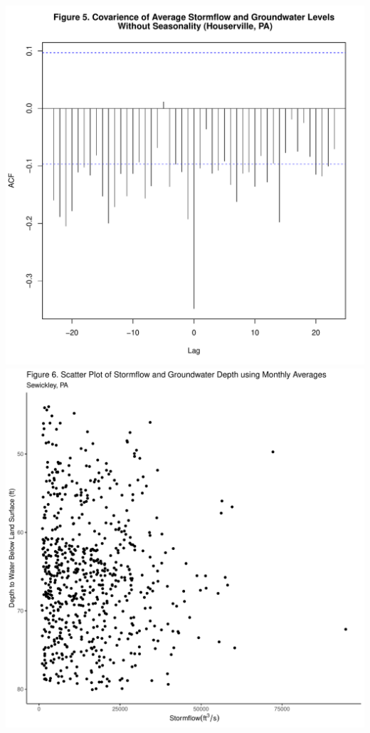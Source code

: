 \documentclass[
  12pt,
]{article}
\begin{document}
\includegraphics{Elliott_WDA_Project_files/figure-latex/groundwater_lag-3.pdf}
\includegraphics{Elliott_WDA_Project_files/figure-latex/groundwater_lag-4.pdf}
\end{document}
